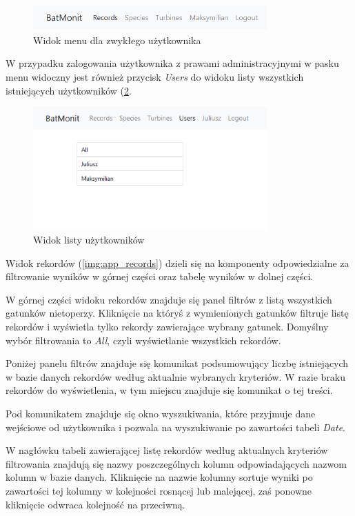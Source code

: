 \documentclass{sprz}
\begin{document}
\begin{figure}[h]
  \centering
  \includegraphics[width=0.8\textwidth]{sprz/app_menu_regular_user}
  \caption{Widok menu dla zwykłego użytkownika}
  \label{img:app_menu_regular_user}
\end{figure}

W przypadku zalogowania użytkownika z prawami administracyjnymi w pasku menu widoczny jest również przycisk \textit{Users} do widoku listy wszystkich istniejących użytkowników (\ref{img:app_users}.

\begin{figure}[h]
  \centering
  \includegraphics[width=0.8\textwidth]{sprz/app_users}
  \caption{Widok listy użytkowników}
  \label{img:app_users}
\end{figure}

Widok rekordów (\ref{img:app_records}) dzieli się na komponenty odpowiedzialne za filtrowanie wyników w górnej części oraz tabelę wyników w dolnej części.

W górnej części widoku rekordów znajduje się panel filtrów z listą wszystkich gatunków nietoperzy. Kliknięcie na któryś z wymienionych gatunków filtruje listę rekordów i wyświetla tylko rekordy zawierające wybrany gatunek. Domyślny wybór filtrowania to \textit{All}, czyli wyświetlanie wszystkich rekordów.

Poniżej panelu filtrów znajduje się komunikat podsumowujący liczbę istniejących w bazie danych rekordów według aktualnie wybranych kryteriów. W razie braku rekordów do wyświetlenia, w tym miejscu znajduje się komunikat o tej treści.

Pod komunikatem znajduje się okno wyszukiwania, które przyjmuje dane wejściowe od użytkownika i pozwala na wyszukiwanie po zawartości tabeli \textit{Date}.

W nagłówku tabeli zawierającej listę rekordów według aktualnych kryteriów filtrowania znajdują się nazwy poszczególnych kolumn odpowiadających nazwom kolumn w bazie danych. Kliknięcie na nazwie kolumny sortuje wyniki po zawartości tej kolumny w kolejności rosnącej lub malejącej, zaś ponowne kliknięcie odwraca kolejność na przeciwną.
\end{document}
